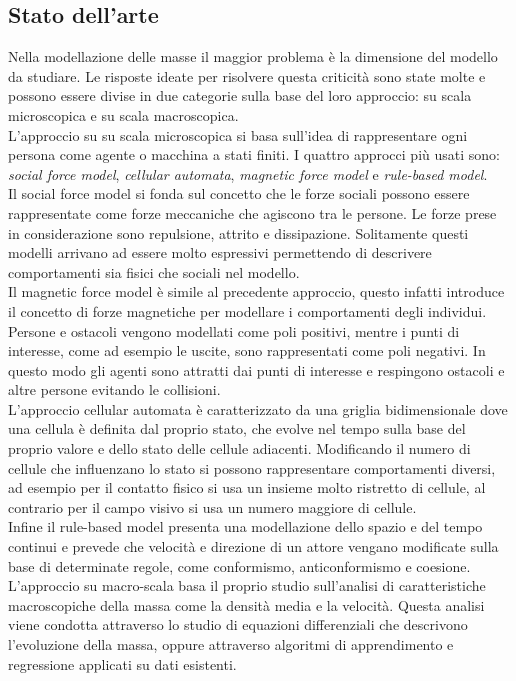 \subsection{Stato dell'arte}
\label{subsec:stato-dell-arte}
Nella modellazione delle masse il maggior problema è la dimensione del modello da studiare. Le risposte ideate per risolvere questa criticità sono state molte e possono essere divise in due categorie sulla base del loro approccio: su scala microscopica e su scala macroscopica.\\
L'approccio su su scala microscopica si basa sull'idea di rappresentare ogni persona come agente o macchina a stati finiti. I quattro approcci più usati sono: \textit{social force model}, \textit{cellular automata}, \textit{magnetic force model} e \textit{rule-based model}.\\
Il social force model \cite{helbing} si fonda sul concetto che le forze sociali possono essere rappresentate come forze meccaniche che agiscono tra le persone. Le forze prese in considerazione sono repulsione, attrito e dissipazione. Solitamente questi modelli arrivano ad essere molto espressivi permettendo di descrivere comportamenti sia fisici che sociali nel modello.\\
Il magnetic force model \cite{okazaki} è simile al precedente approccio, questo infatti introduce il concetto di forze magnetiche per modellare i comportamenti degli individui. Persone e ostacoli vengono modellati come poli positivi, mentre i punti di interesse, come ad esempio le uscite, sono rappresentati come poli negativi. In questo modo gli agenti sono attratti dai punti di interesse e respingono ostacoli e altre persone evitando le collisioni.\\
L'approccio cellular automata \cite{dijkstra} è caratterizzato da una griglia bidimensionale dove una cellula è definita dal proprio stato, che evolve nel tempo sulla base del proprio valore e dello stato delle cellule adiacenti. Modificando il numero di cellule che influenzano lo stato si possono rappresentare comportamenti diversi, ad esempio per il contatto fisico si usa un insieme molto ristretto di cellule, al contrario per il campo visivo si usa un numero maggiore di cellule.\\
Infine il rule-based model \cite{reynolds} presenta una modellazione dello spazio e del tempo continui e prevede che velocità e  direzione di un attore vengano modificate sulla base di determinate regole, come conformismo, anticonformismo e coesione.\\
L'approccio su macro-scala basa il proprio studio sull'analisi di caratteristiche macroscopiche della massa come la densità media e la velocità. Questa analisi viene condotta attraverso lo studio di equazioni differenziali che descrivono l'evoluzione della massa, oppure attraverso algoritmi di apprendimento e regressione applicati su dati esistenti. \\
